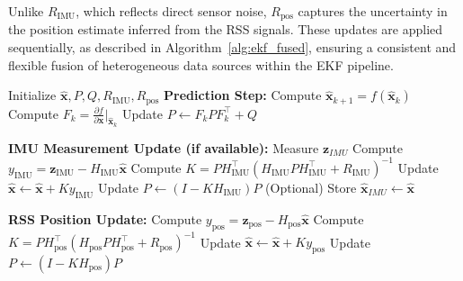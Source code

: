 \documentclass{ifacconf}
\begin{document}
Unlike \( R_{\text{IMU}} \), which reflects direct sensor noise, \( R_{\text{pos}} \) captures the uncertainty in the position estimate inferred from the RSS signals. These updates are applied sequentially, as described in Algorithm~\ref{alg:ekf_fused}, ensuring a consistent and flexible fusion of heterogeneous data sources within the EKF pipeline.
    \begin{algorithm}
    \caption{Extended Kalman Filter with IMU and Position Correction}
    \label{alg:ekf_fused}
    \begin{algorithmic}[1]
        \State Initialize $\hat{\mathbf{x}}, P, Q, R_{\text{IMU}}, R_{\text{pos}}$
            \State \textbf{Prediction Step:}
            \State \hspace{1em} Compute $\hat{\mathbf{x}}_{k+1} = f(\hat{\mathbf{x}}_k)$
            \State \hspace{1em} Compute $F_k = \frac{\partial f}{\partial \mathbf{x}} \big|_{\hat{\mathbf{x}}_k}$
            \State \hspace{1em} Update $P \gets F_k P F_k^\top + Q$

            \State \textbf{IMU Measurement Update (if available):}
            \State \hspace{1em} Measure $\mathbf{z}_{IMU}$
            \State \hspace{1em} Compute $y_{\text{IMU}} = \mathbf{z}_{\text{IMU}} - H_{\text{IMU}} \hat{\mathbf{x}}$
            \State \hspace{1em} Compute $K = P H_{\text{IMU}}^\top (H_{\text{IMU}} P H_{\text{IMU}}^\top + R_{\text{IMU}})^{-1}$
            \State \hspace{1em} Update $\hat{\mathbf{x}} \gets \hat{\mathbf{x}} + K y_{\text{IMU}}$
            \State \hspace{1em} Update $P \gets (I - K H_{\text{IMU}}) P$
            \State \hspace{1em} (Optional) Store $\hat{\mathbf{x}}_{IMU} \gets \hat{\mathbf{x}}$
            

            \State \textbf{RSS Position Update:}
            \State \hspace{1em} Compute $y_{\text{pos}} = \mathbf{z}_{\text{pos}} - H_{\text{pos}} \hat{\mathbf{x}}$
            \State \hspace{1em} Compute $K = P H_{\text{pos}}^\top (H_{\text{pos}} P H_{\text{pos}}^\top + R_{\text{pos}})^{-1}$
            \State \hspace{1em} Update $\hat{\mathbf{x}} \gets \hat{\mathbf{x}} + K y_{\text{pos}}$
            \State \hspace{1em} Update $P \gets (I - K H_{\text{pos}}) P$
        \EndWhile
    \end{algorithmic}
\end{algorithm}
\end{document}
